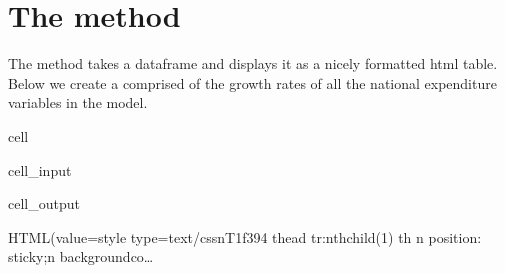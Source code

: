 \documentclass[letterpaper,10pt,english]{jupyterBook}
\begin{document}
\section{The  method}
\label{\detokenize{content/07_MoreFeatures/modelwidgets:the-html-widget-df-method}}
\sphinxAtStartPar
The  method takes a dataframe and displays it as a nicely formatted html table.  Below we create a  comprised of the growth rates of all the national expenditure variables in the  model.

\begin{sphinxuseclass}{cell}\begin{sphinxVerbatimInput}

\begin{sphinxuseclass}{cell_input}
\begin{sphinxVerbatim}[commandchars=\\\{\}]
\PYG{p}{[}\PYG{p}{]} 

\PYG{p}{[}\PYG{p}{]}
\end{sphinxVerbatim}

\end{sphinxuseclass}\end{sphinxVerbatimInput}
\begin{sphinxVerbatimOutput}

\begin{sphinxuseclass}{cell_output}
\begin{sphinxVerbatim}[commandchars=\\\{\}]
HTML(value=\PYGZsq{}\PYGZlt{}style type=\PYGZdq{}text/css\PYGZdq{}\PYGZgt{}\PYGZbs{}n\PYGZsh{}T\PYGZus{}1f394 thead tr:nth\PYGZhy{}child(1) th \PYGZob{}\PYGZbs{}n  position: sticky;\PYGZbs{}n  background\PYGZhy{}co…
\end{sphinxVerbatim}

\end{sphinxuseclass}\end{sphinxVerbatimOutput}

\end{sphinxuseclass}
\end{document}

